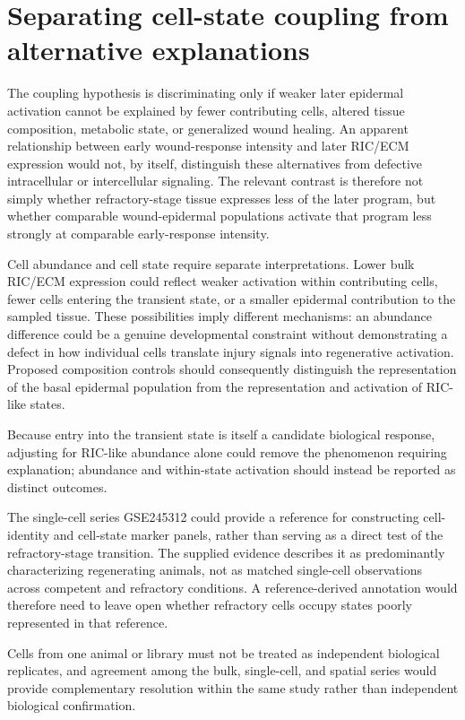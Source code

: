 \documentclass[11pt]{article}
\begin{document}
\section{Separating cell-state coupling from alternative explanations}
The coupling hypothesis is discriminating only if weaker later epidermal activation cannot be explained by fewer contributing cells, altered tissue composition, metabolic state, or generalized wound healing. An apparent relationship between early wound-response intensity and later RIC/ECM expression would not, by itself, distinguish these alternatives from defective intracellular or intercellular signaling. The relevant contrast is therefore not simply whether refractory-stage tissue expresses less of the later program, but whether comparable wound-epidermal populations activate that program less strongly at comparable early-response intensity.

Cell abundance and cell state require separate interpretations. Lower bulk RIC/ECM expression could reflect weaker activation within contributing cells, fewer cells entering the transient state, or a smaller epidermal contribution to the sampled tissue. These possibilities imply different mechanisms: an abundance difference could be a genuine developmental constraint without demonstrating a defect in how individual cells translate injury signals into regenerative activation. Proposed composition controls should consequently distinguish the representation of the basal epidermal population from the representation and activation of RIC-like states.

Because entry into the transient state is itself a candidate biological response, adjusting for RIC-like abundance alone could remove the phenomenon requiring explanation; abundance and within-state activation should instead be reported as distinct outcomes.

The single-cell series GSE245312 could provide a reference for constructing cell-identity and cell-state marker panels, rather than serving as a direct test of the refractory-stage transition. The supplied evidence describes it as predominantly characterizing regenerating animals, not as matched single-cell observations across competent and refractory conditions. A reference-derived annotation would therefore need to leave open whether refractory cells occupy states poorly represented in that reference.

Cells from one animal or library must not be treated as independent biological replicates, and agreement among the bulk, single-cell, and spatial series would provide complementary resolution within the same study rather than independent biological confirmation.
\end{document}
